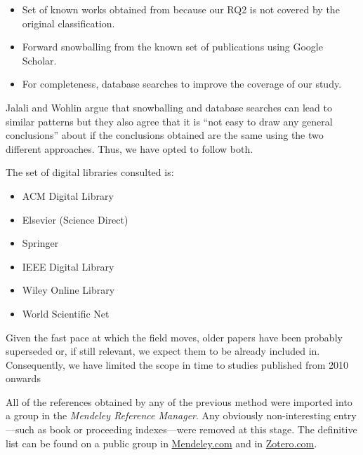 \begin{itemize}
  \item Set of known works obtained from \cite{Idreos2015} because our RQ2 is
    not covered by the original classification.
  \item Forward snowballing\cite{Webster2002} from the known set of publications using Google Scholar.
  \item For completeness, database searches to improve the coverage of our study.
\end{itemize}

Jalali and Wohlin\cite{Jalali2012} argue that snowballing and database searches
can lead to similar patterns but they also agree that it is
``not easy to draw any general conclusions'' about if the conclusions obtained are the same
using the two different approaches. Thus, we have opted to follow both.

The set of digital libraries consulted is:

\begin{itemize}
  \item ACM Digital Library
  \item Elsevier (Science Direct)
  \item Springer
  \item IEEE Digital Library
  \item Wiley Online Library
  \item World Scientific Net
\end{itemize}

Given the fast pace at which the field moves, older papers have been probably
superseded or, if still relevant, we expect them to be already included in\cite{Idreos2015}.
Consequently, we have limited the scope in time to studies published from 2010 onwards

All of the references obtained by any of the previous method were imported into
a group in the \emph{Mendeley Reference Manager}. Any obviously non-interesting entry
---such as book or proceeding indexes---were removed at this stage.
The definitive list can be found on a public group in
\href{https://www.mendeley.com/community/interactive-data-exploration-in-science-systematic-mapping/}{Mendeley.com} and in
\href{https://www.zotero.org/groups/4517638/interactive-data-exploration-in-science-systematic-mapping/library}{Zotero.com}\footnotemark.


